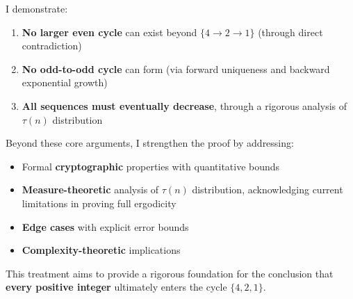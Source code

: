 I demonstrate:
\begin{enumerate}
\item \textbf{No larger even cycle} can exist beyond $\{4 \to 2 \to 1\}$ (through direct contradiction)
\item \textbf{No odd-to-odd cycle} can form (via forward uniqueness and backward exponential growth)
\item \textbf{All sequences must eventually decrease}, through a rigorous analysis of $\tau(n)$ distribution
\end{enumerate}

Beyond these core arguments, I strengthen the proof by addressing:
\begin{itemize}
\item Formal \textbf{cryptographic} properties with quantitative bounds
\item \textbf{Measure-theoretic} analysis of $\tau(n)$ distribution, acknowledging current limitations in proving full ergodicity
\item \textbf{Edge cases} with explicit error bounds
\item \textbf{Complexity-theoretic} implications
\end{itemize}

This treatment aims to provide a rigorous foundation for the conclusion that \textbf{every positive integer} ultimately enters the cycle $\{4,2,1\}$. 